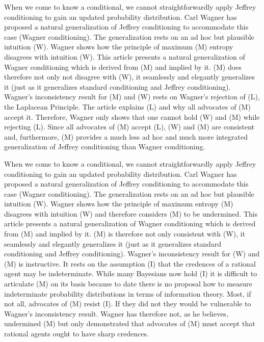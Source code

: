 When we come to know a conditional, we cannot straightforwardly apply
Jeffrey conditioning to gain an updated probability distribution. Carl
Wagner has proposed a natural generalization of Jeffrey conditioning
to accommodate this case (Wagner conditioning). The generalization
rests on an ad hoc but plausible intuition (W). Wagner shows how the
principle of maximum (M) entropy disagrees with intuition (W). This
article presents a natural generalization of Wagner conditioning which
is derived from (M) and implied by it. (M) does therefore not only not
disagree with (W), it seamlessly and elegantly generalizes it (just as
it generalizes standard conditioning and Jeffrey conditioning).
Wagner's inconsistency result for (M) and (W) rests on Wagner's
rejection of (L), the Laplacean Principle. The article explains (L)
and why all advocates of (M) accept it. Therefore, Wagner only shows
that one cannot hold (W) and (M) while rejecting (L). Since all
advocates of (M) accept (L), (W) and (M) are consistent and,
furthermore, (M) provides a much less ad hoc and much more integrated
generalization of Jeffrey conditioning than Wagner conditioning.

When we come to know a conditional, we cannot straightforwardly apply
Jeffrey conditioning to gain an updated probability distribution. Carl
Wagner has proposed a natural generalization of Jeffrey conditioning
to accommodate this case (Wagner conditioning). The generalization
rests on an ad hoc but plausible intuition (W). Wagner shows how the
principle of maximum entropy (M) disagrees with intuition (W) and
therefore considers (M) to be undermined. This article presents a
natural generalization of Wagner conditioning which is derived from
(M) and implied by it. (M) is therefore not only consistent with (W),
it seamlessly and elegantly generalizes it (just as it generalizes
standard conditioning and Jeffrey conditioning). Wagner's
inconsistency result for (W) and (M) is instructive. It rests on the
assumption (I) that the credences of a rational agent may be
indeterminate. While many Bayesians now hold (I) it is difficult to
articulate (M) on its basis because to date there is no proposal how
to measure indeterminate probability distributions in terms of
information theory. Most, if not all, advocates of (M) resist (I). If
they did not they would be vulnerable to Wagner's inconsistency
result. Wagner has therefore not, as he believes, undermined (M) but
only demonstrated that advocates of (M) must accept that rational
agents ought to have sharp credences.
